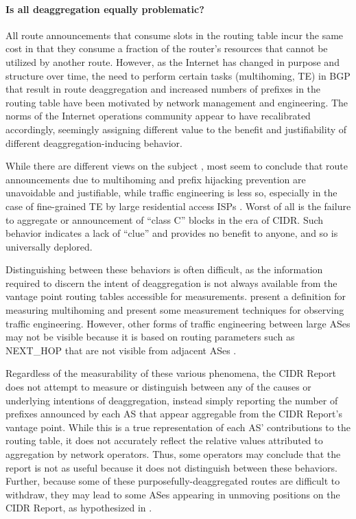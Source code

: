 \paragraph{Is all deaggregation equally problematic?}
All route announcements that consume slots in the routing table incur the same
cost in that they consume a fraction of the router's resources that cannot be
utilized by another route. However, as the Internet has changed in purpose and
structure over time, the need to perform certain tasks (multihoming, TE) in BGP
that result in route deaggregation and increased numbers of prefixes in the
routing table have been motivated by network management and engineering. The
norms of the Internet operations community appear to have recalibrated
accordingly, seemingly assigning different value to the benefit and
justifiability of different deaggregation-inducing behavior.

While there are different views on the subject \cite{Li:2011vn}, most seem to
conclude that route announcements due to multihoming and prefix hijacking
prevention are unavoidable and justifiable, while traffic engineering is less
so, especially in the case of fine-grained TE by large residential access ISPs
\cite{Steenbergen:2010nx}. Worst of all is the failure to aggregate or
announcement of ``class C'' blocks in the era of CIDR. Such behavior indicates
a lack of ``clue'' and provides no benefit to anyone, and so is universally
deplored.

Distinguishing between these behaviors is often difficult, as the information
required to discern the intent of deaggregation is not always available from
the vantage point routing tables accessible for measurements. \cite{Bu:2004fk}
present a definition for measuring multihoming and \cite{Cittadini:2010pi}
present some measurement techniques for observing traffic engineering. However,
other forms of traffic engineering between large ASes may not be visible
because it is based on routing parameters such as NEXT\_HOP that are not
visible from adjacent ASes \cite{Steenbergen:2010nx}.

Regardless of the measurability of these various phenomena, the CIDR Report
does not attempt to measure or distinguish between any of the causes or
underlying intentions of deaggregation, instead simply reporting the number of
prefixes announced by each AS that appear aggregable from the CIDR Report's
vantage point. While this is a true representation of each AS' contributions to
the routing table, it does not accurately reflect the relative values
attributed to aggregation by network operators. Thus, some operators may
conclude that the report is not as useful because it does not distinguish
between these behaviors. Further, because some of these
purposefully-deaggregated routes are difficult to withdraw, they may lead to
some ASes appearing in unmoving positions on the CIDR Report, as hypothesized
in \cite{Steenbergen:2010nx}.


